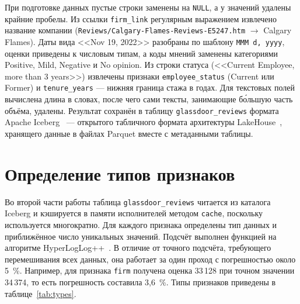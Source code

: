 При подготовке данных пустые строки заменены на \texttt{NULL}, а у значений удалены крайние пробелы. Из ссылки \texttt{firm\_link} регулярным выражением извлечено название компании (\texttt{Reviews/Calgary-Flames-Reviews-E5247.htm} $\to$ Calgary Flames). Даты вида <<Nov 19, 2022>> разобраны по шаблону \texttt{MMM d, yyyy}, оценки приведены к числовым типам, а коды мнений заменены категориями Positive, Mild, Negative и No opinion. Из строки статуса (<<Current Employee, more than 3 years>>) извлечены признаки \texttt{employee\_status} (Current или Former) и \texttt{tenure\_years} --- нижняя граница стажа в годах. Для текстовых полей вычислена длина в словах, после чего сами тексты, занимающие бо́льшую часть объёма, удалены. Результат сохранён в таблицу \texttt{glassdoor\_reviews} формата Apache Iceberg~\cite{iceberg2024docs} --- открытого табличного формата архитектуры LakeHouse~\cite{zaharia2021lakehouse}, хранящего данные в файлах Parquet вместе с метаданными таблицы.

\vspace{\baselineskip}\section{Определение типов признаков}\vspace{\baselineskip}

Во второй части работы таблица \texttt{glassdoor\_reviews} читается из каталога Iceberg и кэшируется в памяти исполнителей методом \texttt{cache}, поскольку используется многократно. Для каждого признака определены тип данных и приближённое число уникальных значений. Подсчёт выполнен функцией на алгоритме HyperLogLog++~\cite{heule2013hll}. В отличие от точного подсчёта, требующего перемешивания всех данных, она работает за один проход с погрешностью около 5~\%. Например, для признака \texttt{firm} получена оценка 33\,128 при точном значении 34\,374, то есть погрешность составила 3,6~\%. Типы признаков приведены в таблице~\ref{tab:types}.


